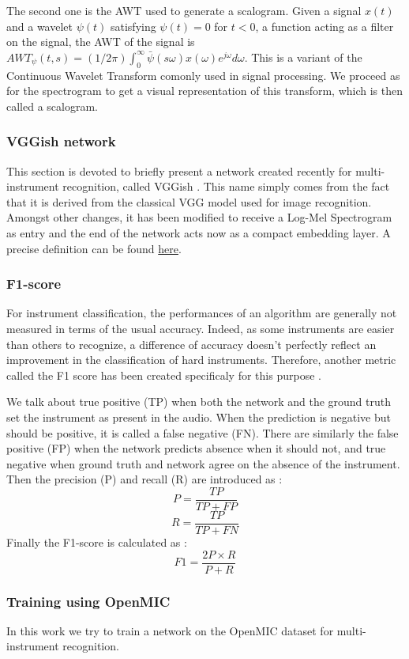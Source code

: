 \documentclass[final]{cvpr}
\begin{document}
The second one is the AWT used to generate a scalogram. Given a signal $x(t)$ and a wavelet $\psi(t)$ satisfying $\psi(t)=0$ for $t<0$, a function acting as a filter on the signal, the AWT of the signal is $AWT_{\psi}(t,s)=(1/2\pi)\int_0^\infty \bar{\psi}(s\omega)x(\omega)e^{j\omega}d\omega$. This is a variant of the Continuous Wavelet Transform comonly used in signal processing. We proceed as for the spectrogram to get a visual representation of this transform, which is then called a scalogram.
\subsubsection{VGGish network}
This section is devoted to briefly present a network created recently for multi-instrument recognition, called VGGish \cite{VGGish_net}. This name simply comes from the fact that it is derived from the classical VGG model \cite{vgg} used for image recognition. Amongst other changes, it has been modified to receive a Log-Mel Spectrogram as entry and the end of the network acts now as a compact embedding layer. A precise definition can be found \href{https://github.com/tensorflow/models/tree/master/research/audioset/vggish}{here}.
\subsubsection{F1-score}
For instrument classification, the performances of an algorithm are generally not measured in terms of the usual accuracy. Indeed, as some instruments are easier than others to recognize, a difference of accuracy doesn't perfectly reflect an improvement in the classification of hard instruments. Therefore, another metric called the F1 score has been created specificaly for this purpose \cite{metric}. 

We talk about true positive (TP) when both the network and the ground truth set the instrument as present in the audio. When the prediction is negative but should be positive, it is called a false negative (FN). There are similarly the false positive (FP) when the network predicts absence when it should not, and true negative when ground truth and network agree on the absence of the instrument. Then the precision (P) and recall (R) are introduced as :
\[P = \frac{TP}{TP+FP}\]
\[R=\frac{TP}{TP+FN}\]
Finally the F1-score is calculated as :
\[F1=\frac{2P\times R}{P+R}\]
\subsubsection{Training using OpenMIC}
In this work we try to train a network on the OpenMIC dataset for multi-instrument recognition. 
\end{document}
